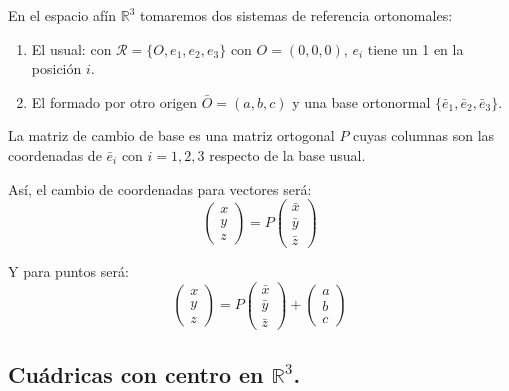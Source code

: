 \documentclass[11pt, a4paper]{article}
\newif\IfInSansMode
\newcommand{\R}{\mathbb{R}}
\theoremstyle{theorem-style}
\theoremstyle{definition-style}
\theoremstyle{remark-style}
\theoremstyle{example-style}
\newenvironment{nlist}
{\begin{enumerate}
    \renewcommand\labelenumi{(\emph{\roman{enumi})}}}
  {\end{enumerate}}
\begin{document}
En el espacio afín $\R^3$ tomaremos dos sistemas de referencia ortonomales:
\begin{nlist}
	\item El usual: con $\mathcal R = \{O, e_1, e_2, e_3\}$ con $O=(0,0,0)$, $e_i$ tiene un 1 en la posición $i$.
	\item El formado por otro origen $\bar O = (a,b,c)$ y una base ortonormal $\{\bar e_1, \bar e_2, \bar e_3\}$. 
\end{nlist}

La matriz de cambio de base es una matriz ortogonal $P$ cuyas columnas son las coordenadas de $\bar e_i$ con $i=1,2,3$ respecto de la base usual.

Así, el cambio de coordenadas para vectores será:
\[
\begin{pmatrix}
x\\
y\\
z
\end{pmatrix}  = P \begin{pmatrix}
\bar x\\
\bar y\\
\bar z
\end{pmatrix} 
\]

Y para puntos será:
\[
\begin{pmatrix}
x\\
y\\
z
\end{pmatrix} = P \begin{pmatrix}
\bar x\\
\bar y\\
\bar z
\end{pmatrix}  + \begin{pmatrix}
 a\\ 
 b\\
 c
\end{pmatrix} 
\]





\subsection{Cuádricas con centro en $\mathbb{R}^3$.}
\end{document}
